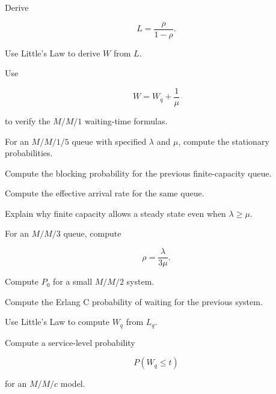 \begin{exercise}[3]
Derive

\[
L
=
\frac{\rho}{1-\rho}.
\]
\end{exercise}

\begin{exercise}[3]
Use Little's Law to derive \(W\) from \(L\).
\end{exercise}

\begin{exercise}[3]
Use

\[
W=W_q+\frac1\mu
\]

to verify the \(M/M/1\) waiting-time formulas.
\end{exercise}

\begin{exercise}[3]
For an \(M/M/1/5\) queue with specified \(\lambda\) and \(\mu\), compute
the stationary probabilities.
\end{exercise}

\begin{exercise}[3]
Compute the blocking probability for the previous finite-capacity queue.
\end{exercise}

\begin{exercise}[3]
Compute the effective arrival rate for the same queue.
\end{exercise}

\begin{exercise}[3]
Explain why finite capacity allows a steady state even when
\(\lambda\geq\mu\).
\end{exercise}

\begin{exercise}[3]
For an \(M/M/3\) queue, compute

\[
\rho
=
\frac{\lambda}{3\mu}.
\]
\end{exercise}

\begin{exercise}[3]
Compute \(P_0\) for a small \(M/M/2\) system.
\end{exercise}

\begin{exercise}[3]
Compute the Erlang C probability of waiting for the previous system.
\end{exercise}

\begin{exercise}[3]
Use Little's Law to compute \(W_q\) from \(L_q\).
\end{exercise}

\begin{exercise}[3]
Compute a service-level probability

\[
P(W_q\leq t)
\]

for an \(M/M/c\) model.
\end{exercise}


